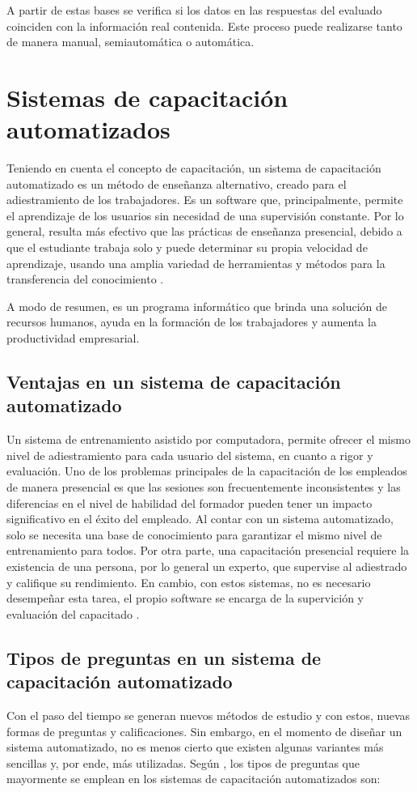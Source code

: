 A partir de estas bases se verifica si los datos en las respuestas del evaluado coinciden con la información real contenida. Este proceso puede realizarse tanto de manera manual, semiautomática o automática.


\section{Sistemas de capacitación automatizados}
Teniendo en cuenta el concepto de capacitación, un sistema de capacitación automatizado es un método de enseñanza alternativo, creado para el adiestramiento de los trabajadores. Es un software que, principalmente, permite el aprendizaje de los usuarios sin necesidad de una supervisión constante. Por lo general, resulta más efectivo que las prácticas de enseñanza presencial, debido a que el estudiante trabaja solo y puede determinar su propia velocidad de aprendizaje, usando una amplia variedad de herramientas y métodos para la transferencia del conocimiento \cite{ISEM2022}.

A modo de resumen, es un programa informático que brinda una solución de recursos humanos, ayuda en la formación de los trabajadores y aumenta la productividad empresarial.

\subsection{Ventajas en un sistema de capacitación automatizado}
Un sistema de entrenamiento asistido por computadora, permite ofrecer el mismo nivel de adiestramiento para cada usuario del sistema, en cuanto a rigor y evaluación. Uno de los problemas principales de la capacitación de los empleados de manera presencial es que las sesiones son frecuentemente inconsistentes y las diferencias en el nivel de habilidad del formador pueden tener un impacto significativo en el éxito del empleado. Al contar con un sistema automatizado, solo se necesita una base de conocimiento para garantizar el mismo nivel de entrenamiento para todos. Por otra parte, una capacitación presencial requiere la existencia de una persona, por lo general un experto, que supervise al adiestrado y califique su rendimiento. En cambio, con estos sistemas, no es necesario desempeñar esta tarea, el propio software se encarga de la supervición y evaluación del capacitado \cite{Kanev2017}.

\subsection{Tipos de preguntas en un sistema de capacitación automatizado}
Con el paso del tiempo se generan nuevos métodos de estudio y con estos, nuevas formas de preguntas y calificaciones. Sin embargo, en el momento de diseñar un sistema automatizado, no es menos cierto que existen algunas variantes más sencillas y, por ende, más utilizadas. Según \cite{Laguna2016}, los tipos de preguntas que mayormente se emplean en los sistemas de capacitación automatizados son:

